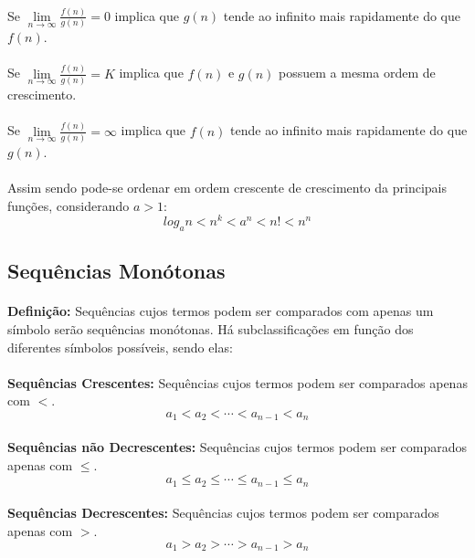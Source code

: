 \documentclass{article}
\begin{document}
        \paragraph{}Se $\lim\limits_{n\to\infty}\frac{f(n)}{g(n)}=0$ implica que $g(n)$ tende ao infinito mais rapidamente do que $f(n)$.
        \paragraph{}Se $\lim\limits_{n\to\infty}\frac{f(n)}{g(n)}=K$ implica que $f(n)$ e $g(n)$ possuem a mesma ordem de crescimento.
        \paragraph{}Se $\lim\limits_{n\to\infty}\frac{f(n)}{g(n)}=\infty$ implica que $f(n)$ tende ao infinito mais rapidamente do que $g(n)$.
        \paragraph{}Assim sendo pode-se ordenar em ordem crescente de crescimento da principais funções, considerando $a>1$:
            \[log_{a}n < n^k < a^n < n! < n^n \]
            
    \subsection{Sequências Monótonas}
        \paragraph{}\textbf{Definição:} Sequências cujos termos podem ser comparados com apenas um símbolo serão sequências monótonas. Há subclassificações em função dos diferentes símbolos possíveis, sendo elas:
        \paragraph{}\textbf{Sequências Crescentes:} Sequências cujos termos podem ser comparados apenas com $<$.
            \[a_1<a_2<\cdots<a_{n-1}<a_n\]
        \paragraph{}\textbf{Sequências não Decrescentes:} Sequências cujos termos podem ser comparados apenas com $\le$.
            \[a_1\le a_2\le \cdots \le a_{n-1} \le a_n\]
        \paragraph{}\textbf{Sequências Decrescentes:} Sequências cujos termos podem ser comparados apenas com $>$.
            \[a_1>a_2>\cdots>a_{n-1}>a_n\]
\end{document}
